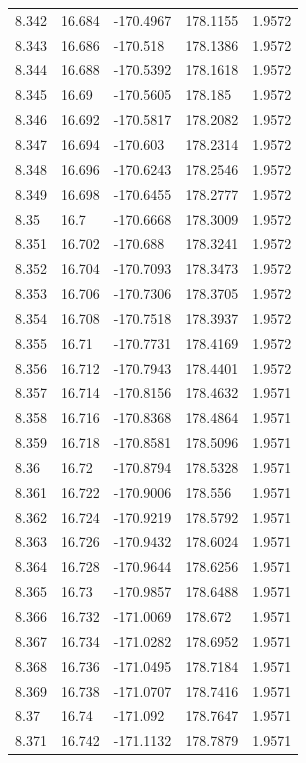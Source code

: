 \begin{tabular}{lllll}
8.342 & 16.684 & -170.4967 & 178.1155 & 1.9572 \\
8.343 & 16.686 & -170.518 & 178.1386 & 1.9572 \\
8.344 & 16.688 & -170.5392 & 178.1618 & 1.9572 \\
8.345 & 16.69 & -170.5605 & 178.185 & 1.9572 \\
8.346 & 16.692 & -170.5817 & 178.2082 & 1.9572 \\
8.347 & 16.694 & -170.603 & 178.2314 & 1.9572 \\
8.348 & 16.696 & -170.6243 & 178.2546 & 1.9572 \\
8.349 & 16.698 & -170.6455 & 178.2777 & 1.9572 \\
8.35 & 16.7 & -170.6668 & 178.3009 & 1.9572 \\
8.351 & 16.702 & -170.688 & 178.3241 & 1.9572 \\
8.352 & 16.704 & -170.7093 & 178.3473 & 1.9572 \\
8.353 & 16.706 & -170.7306 & 178.3705 & 1.9572 \\
8.354 & 16.708 & -170.7518 & 178.3937 & 1.9572 \\
8.355 & 16.71 & -170.7731 & 178.4169 & 1.9572 \\
8.356 & 16.712 & -170.7943 & 178.4401 & 1.9572 \\
8.357 & 16.714 & -170.8156 & 178.4632 & 1.9571 \\
8.358 & 16.716 & -170.8368 & 178.4864 & 1.9571 \\
8.359 & 16.718 & -170.8581 & 178.5096 & 1.9571 \\
8.36 & 16.72 & -170.8794 & 178.5328 & 1.9571 \\
8.361 & 16.722 & -170.9006 & 178.556 & 1.9571 \\
8.362 & 16.724 & -170.9219 & 178.5792 & 1.9571 \\
8.363 & 16.726 & -170.9432 & 178.6024 & 1.9571 \\
8.364 & 16.728 & -170.9644 & 178.6256 & 1.9571 \\
8.365 & 16.73 & -170.9857 & 178.6488 & 1.9571 \\
8.366 & 16.732 & -171.0069 & 178.672 & 1.9571 \\
8.367 & 16.734 & -171.0282 & 178.6952 & 1.9571 \\
8.368 & 16.736 & -171.0495 & 178.7184 & 1.9571 \\
8.369 & 16.738 & -171.0707 & 178.7416 & 1.9571 \\
8.37 & 16.74 & -171.092 & 178.7647 & 1.9571 \\
8.371 & 16.742 & -171.1132 & 178.7879 & 1.9571 \\

\end{tabular}
